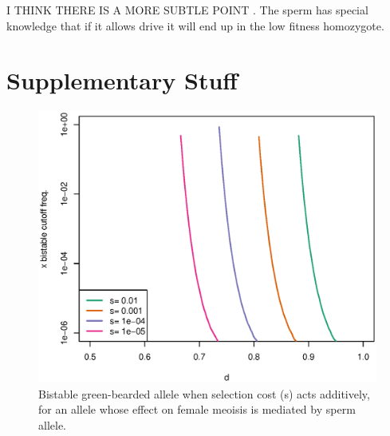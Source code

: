 \documentclass[12pt,letterpaper]{article}
\begin{document}
I THINK THERE IS A MORE SUBTLE POINT . The sperm has special knowledge
that if it allows drive it will end up in the low fitness homozygote. 



\section*{Supplementary Stuff}

\begin{figure}
\includegraphics[width = 0.8 \textwidth]{Figures/bistable_x_vs_d_additive_s.eps} 
\caption{Bistable green-bearded allele when selection cost (s) acts
  additively, for an allele whose effect
 on female meoisis is mediated by sperm allele. }  \label{bistable_additive}
\end{figure}
\end{document}
